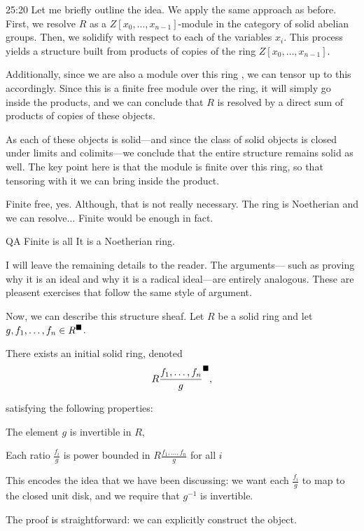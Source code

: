 \begin{unfinished}{25:20}
Let me briefly outline the idea. We apply the same approach as before. First, we resolve $R$ as a $Z[x_0, \dots, x_{n-1}]$-module in the category of solid abelian groups. Then, we solidify with respect to each of the variables $x_i$. This process yields a structure built from products of copies of the ring $Z[x_0, \dots, x_{n-1}]$. 

Additionally, since we are also a module over this ring , we can tensor up to this accordingly. 
Since this is a finite free module over the ring, it will simply go inside the products, and we can conclude that $R$ is resolved by a direct sum of products of copies of these objects. 

As each of these objects is solid---and since the class of solid objects is closed under limits and colimits---we conclude that the entire structure remains solid as well. 
The key point here is that the module is finite over this ring, so that tensoring with it we can bring inside the product.

Finite free, yes. Although, that is not really necessary. 
The ring is Noetherian and we can resolve... Finite would be enough in fact.

QA
Finite is all 
It is a Noetherian ring.

I will leave the remaining details to the reader. The arguments--- such as proving why it is an ideal and why it is a radical ideal---are entirely analogous. These are pleasent exercises that follow the same style of argument.

Now, we can describe this structure sheaf. Let $R$ be a solid ring and let $g, f_1, \dots, f_n \in R^\blacksquare$. 

\bcl
There exists an initial solid ring, denoted 
\begin{align*} 
R \frac{f_1,\ldots,f_n}{g}^\blacksquare,
\end{align*}

satisfying the following properties:
\ben
	\item The element $g$ is invertible in $R$,
	\item Each ratio $\frac{f_i}{g}$ is power bounded in $R \frac{f_1,\ldots,f_n}{g}$ for all $i$
\een
\ecl

This encodes the idea that we have been discussing: we want each $\frac{f_i}{g}$ to map to the closed unit disk, and we require that $g^{-1}$ is invertible.

The proof is straightforward: we can explicitly construct the object.


\end{unfinished}
